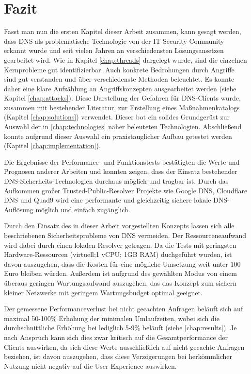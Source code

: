\chapter{Fazit}
Fasst man nun die ersten Kapitel dieser Arbeit zusammen, kann gesagt werden, dass DNS als problematische Technologie von der IT-Security-Community erkannt wurde und seit vielen Jahren an verschiedensten Lösungsansetzen gearbeitet wird. Wie in Kapitel \ref{chap:threads} dargelegt wurde, sind die einzelnen Kernprobleme gut identifizierbar. Auch konkrete Bedrohungen durch Angriffe sind gut verstanden und über verschiedenste Methoden beleuchtet. Es konnte daher eine klare Aufzählung an Angriffskonzepten ausgearbeitet werden (siehe Kapitel \ref{chap:attacks}). Diese Darstellung der Gefahren für DNS-Clients wurde, zusammen mit bestehender Literatur, zur Erstellung eines Maßnahmenkatalogs (Kapitel \ref{chap:solutions}) verwendet. Dieser bot ein solides Grundgerüst zur Auswahl der in \ref{chap:technologies} näher beleuteten Technologien. Abschließend konnte aufgrund dieser Auswahl ein praxistauglicher Aufbau getestet werden (Kapitel \ref{chap:implementation}). 

Die Ergebnisse der Performance- und Funktionstests bestätigten die Werte und Prognosen anderer Arbeiten und konnten zeigen, dass der Einsatz bestehender DNS-Sicherheits-Technologien durchaus möglich und tragbar ist. Durch das Aufkommen großer Trusted-Public-Resolver Projekte wie Google DNS, Cloudflare DNS und Quad9 wird eine performante und gleichzeitig sichere lokale DNS-Auflösung möglich und einfach zugänglich. 

Durch den Einsatz des in dieser Arbeit vorgestellten Konzepts lassen sich alle beschriebenen Sicherheitsprobleme von DNS vermeiden. Der Ressourceneaufwand wird dabei durch einen lokalen Resolver getragen. Da die Tests mit geringsten Hardware-Ressourcen (virtuell;1 vCPU; 1GB RAM) duchgeführt wurden, ist davon auszugehen, dass die Kosten für eine mögliche Umsetzung weit unter 100 Euro bleiben würden. Außerdem ist aufgrund des gewählten Modus von einem überaus geringen Wartungsaufwand auszugehen, das das Konzept zum sichern kleiner Netzwerke mit geringem Wartungsbudget optimal geeignet.

Der gemessene Performanceverlust bei nicht gecachten Anfragen beläuft sich auf maximal 50-100\% Erhöhung der minimalen Umlaufzeiten, wobei sich die durchschnittliche Erhöhung bei lediglich 5-9\% beläuft  (siehe \ref{chap:results}). Je nach Anspruch kann sich dies zwar kritisch auf die Gesamtperformance der Clients auswirken, da sich diese Werte ausschließlich auf nicht gecachte Anfragen beziehen, ist davon auszugehen, dass diese Verzögerungen bei herkömmlicher Nutzung nicht negativ auf die User-Experience auswirken.

